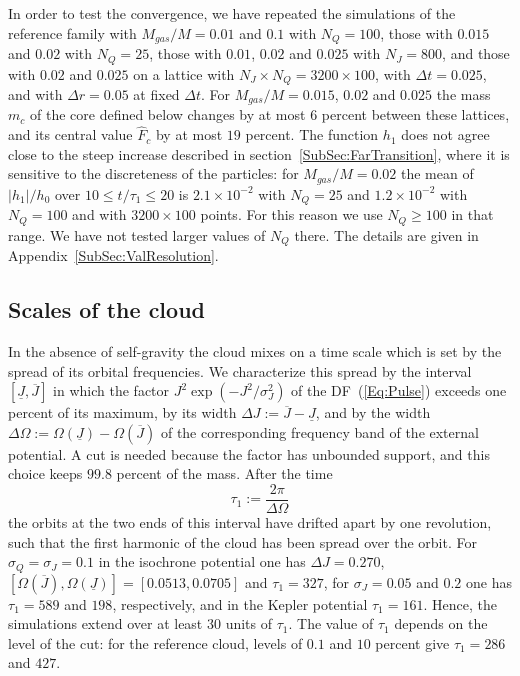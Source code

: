 In order to test the convergence, we have repeated the simulations of the reference family with $M_{gas}/M = 0.01$ and $0.1$ with $N_Q = 100$, those with $0.015$ and $0.02$ with $N_Q = 25$, those with $0.01$, $0.02$ and $0.025$ with $N_J = 800$, and those with $0.02$ and $0.025$ on a lattice with $N_J\times N_Q = 3200\times 100$, with $\Delta t = 0.025$, and with $\Delta r = 0.05$ at fixed $\Delta t$. For $M_{gas}/M = 0.015$, $0.02$ and $0.025$ the mass $m_c$ of the core defined below changes by at most $6$ percent between these lattices, and its central value $\hat{F}_c$ by at most $19$ percent. The function $h_1$ does not agree close to the steep increase described in section~\ref{SubSec:FarTransition}, where it is sensitive to the discreteness of the particles: for $M_{gas}/M = 0.02$ the mean of $|h_1|/h_0$ over $10\leq t/\tau_1\leq 20$ is $2.1\times 10^{-2}$ with $N_Q = 25$ and $1.2\times 10^{-2}$ with $N_Q = 100$ and with $3200\times 100$ points. For this reason we use $N_Q\geq 100$ in that range. We have not tested larger values of $N_Q$ there. The details are given in Appendix~\ref{SubSec:ValResolution}.


\subsection{Scales of the cloud}
\label{SubSec:FarRuns}

In the absence of self-gravity the cloud mixes on a time scale which is set by the spread of its orbital frequencies. We characterize this spread by the interval $[\underline{J},\overline{J}]$ in which the factor $J^2\exp(-J^2/\sigma_J^2)$ of the DF~(\ref{Eq:Pulse}) exceeds one percent of its maximum, by its width $\Delta J := \overline{J} - \underline{J}$, and by the width $\Delta\Omega := \Omega(\underline{J}) - \Omega(\overline{J})$ of the corresponding frequency band of the external potential. A cut is needed because the factor has unbounded support, and this choice keeps $99.8$ percent of the mass. After the time
\begin{equation}
\tau_1 := \frac{2\pi}{\Delta\Omega}
\label{Eq:tau1}
\end{equation}
the orbits at the two ends of this interval have drifted apart by one revolution, such that the first harmonic of the cloud has been spread over the orbit. For $\sigma_Q = \sigma_J = 0.1$ in the isochrone potential one has $\Delta J = 0.270$, $[\Omega(\overline{J}),\Omega(\underline{J})] = [0.0513,0.0705]$ and $\tau_1 = 327$, for $\sigma_J = 0.05$ and $0.2$ one has $\tau_1 = 589$ and $198$, respectively, and in the Kepler potential $\tau_1 = 161$. Hence, the simulations extend over at least $30$ units of $\tau_1$. The value of $\tau_1$ depends on the level of the cut: for the reference cloud, levels of $0.1$ and $10$ percent give $\tau_1 = 286$ and $427$.


